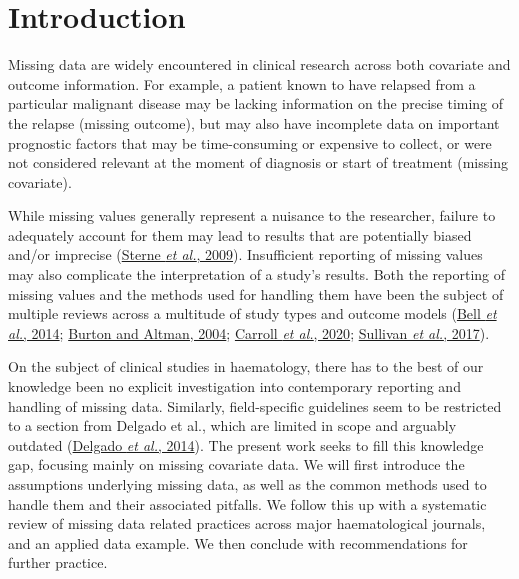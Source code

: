 \documentclass[
  letterpaper,
  DIV=11,
  numbers=noendperiod]{scrreprt}
\begin{document}
\hfill\break

\hypertarget{introduction}{%
\section{Introduction}\label{introduction}}

Missing data are widely encountered in clinical research across both
covariate and outcome information. For example, a patient known to have
relapsed from a particular malignant disease may be lacking information
on the precise timing of the relapse (missing outcome), but may also
have incomplete data on important prognostic factors that may be
time-consuming or expensive to collect, or were not considered relevant
at the moment of diagnosis or start of treatment (missing covariate).

While missing values generally represent a nuisance to the researcher,
failure to adequately account for them may lead to results that are
potentially biased and/or imprecise
(\protect\hyperlink{ref-sterneMultipleImputationMissing2009}{Sterne
\emph{et al.}, 2009}). Insufficient reporting of missing values may also
complicate the interpretation of a study's results. Both the reporting
of missing values and the methods used for handling them have been the
subject of multiple reviews across a multitude of study types and
outcome models (\protect\hyperlink{ref-bellHandlingMissingData2014}{Bell
\emph{et al.}, 2014};
\protect\hyperlink{ref-burtonMissingCovariateData2004}{Burton and
Altman, 2004}; \protect\hyperlink{ref-carrollHowAreMissing2020}{Carroll
\emph{et al.}, 2020};
\protect\hyperlink{ref-sullivanTreatmentMissingData2017}{Sullivan
\emph{et al.}, 2017}).

On the subject of clinical studies in haematology, there has to the best
of our knowledge been no explicit investigation into contemporary
reporting and handling of missing data. Similarly, field-specific
guidelines seem to be restricted to a section from Delgado et al., which
are limited in scope and arguably outdated
(\protect\hyperlink{ref-delgadoSurvivalAnalysisHematologic2014}{Delgado
\emph{et al.}, 2014}). The present work seeks to fill this knowledge
gap, focusing mainly on missing covariate data. We will first introduce
the assumptions underlying missing data, as well as the common methods
used to handle them and their associated pitfalls. We follow this up
with a systematic review of missing data related practices across major
haematological journals, and an applied data example. We then conclude
with recommendations for further practice.
\end{document}
